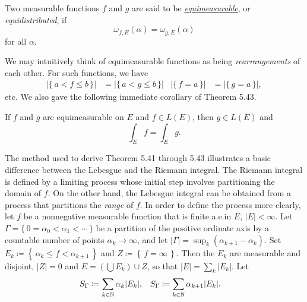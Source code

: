 Two measurable functions $f$ and $g$ are said to be
\href{https://en.wikipedia.org/wiki/Equidistributed_sequence#Sequences_equidistributed_with_respect_to_an_arbitrary_measure}{\emph{equimeasurable}},
or \emph{equidistributed}, if
\[
\omega_{f,E}(\alpha)=\omega_{g,E}(\alpha)
\]
for all $\alpha$.

We may intuitively think of equimeasurable functions as being
\emph{rearrangements} of each other. For such functions, we have
\[
\begin{aligned}
\left|\{\,a<f\leq b\,\}\right|&=
\left|\{\,a<g\leq b\,\}\right|&
\left|\{\,f=a\,\}\right|&=
\left|\{\,g=a\,\}\right|,
\end{aligned}
\]
etc. We also gave the following immediate corollary of Theorem 5.43.

\begin{corollary}[5.44]
If $f$ and $g$ are equimeasurable on $E$ and $f\in L(E)$, then $g\in
L(E)$ and
\[
\int_E f=\int_E g.
\]
\end{corollary}

The method used to derive Theorem 5.41 through 5.43 illustrates a basic
difference between the Lebesgue and the Riemann integral. The Riemann
integral is defined by a limiting process whose initial step involves
partitioning the domain of $f$. On the other hand, the Lebesgue integral
can be obtained from a process that partitions the \emph{range} of $f$. In
order to define the process more clearly, let $f$ be a nonnegative
measurable function that is finite a.e.\@ in $E$, $|E|<\infty$. Let
$\Gamma=\{\,0=\alpha_0<\alpha_1<\cdots\,\}$ be a partition of the positive
ordinate axis by a countable number of points $\alpha_k\to\infty$, and let
$|\Gamma|=\sup_k(\alpha_{k+1}-\alpha_k)$. Set
$E_k\coloneqq\left\{\,\alpha_k\leq f<\alpha_{k+1}\,\right\}$ and
$Z\coloneqq\left\{\,f=\infty\,\right\}$. Then the $E_k$ are measurable and
disjoint, $|Z|=0$ and $E=\left(\bigcup E_k\right)\cup Z$, so that
$|E|=\sum_k|E_k|$. Let
\[
  \begin{aligned}
    S_\Gamma&\coloneqq\sum_{k\in\mathbb{N}}\alpha_k|E_k|,&
    S_\Gamma&\coloneqq\sum_{k\in\mathbb{N}}\alpha_{k+1}|E_k|.
  \end{aligned}
\]

